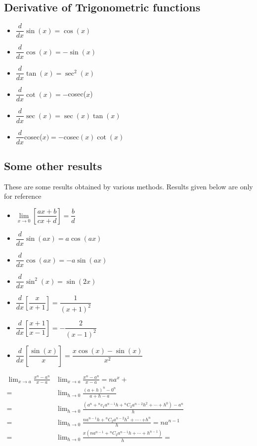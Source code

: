 \documentclass{article}
\begin{document}
\subsection{Derivative of Trigonometric functions}
\begin{itemize}
  \item $\dfrac{d}{dx}\sin(x) = \cos(x)$
  \item $\dfrac{d}{dx}\cos(x) = -\sin(x)$
  \item $\dfrac{d}{dx}\tan(x) = \sec^2(x)$
  \item $\dfrac{d}{dx}\cot(x) = -$cosec($x$)
  \item $\dfrac{d}{dx}\sec(x) = \sec(x)\tan(x)$
  \item $\dfrac{d}{dx}$cosec($x) = -$cosec$(x)\cot(x)$
\end{itemize}

\subsection{Some other results}
\par These are some results obtained by various methods. Results given below are only for reference
\begin{itemize}
  \item $\lim\limits_{x \to 0}\left[\dfrac{ax + b}{cx + d}\right] = \dfrac{b}{d}$
  \item $\dfrac{d}{dx}\sin(ax) = a\cos(ax)$
  \item $\dfrac{d}{dx}\cos(ax) = -a\sin(ax)$
  \item $\dfrac{d}{dx}\sin^2(x) = \sin(2x)$
  \item $\dfrac{d}{dx}\left[\dfrac{x}{x+1}\right] = \dfrac{1}{(x+1)^2}$
  \item $\dfrac{d}{dx}\left[\dfrac{x+1}{x-1}\right] = -\dfrac{2}{(x-1)^2}$
  \item $\dfrac{d}{dx}\left[\dfrac{\sin(x)}{x}\right] = \dfrac{x\cos(x) - \sin(x)}{x^2}$


\end{itemize}
$\begin{aligned} \lim _{x \rightarrow a} \frac{x^{n}-a^{n}}{x-a} & \lim _{x \rightarrow a} \frac{x^{n}-a^{n}}{x-a}=n a^{x}+\\=& \lim _{h \rightarrow 0} \frac{(a+h)^{n}-0^{n}}{a+h-a} \\=& \lim _{h \rightarrow 0} \frac{\left(a^{n}+{ }^{n} c_{1} a^{n-1} h+{ }^{n} C_{2} a^{n-2} h^{2}+\cdots+h^{0}\right)-a^{n}}{h} \\=& \lim _{h \rightarrow 0} \frac{n a^{n-1} h+{ }^{n} C_{2} a^{n-2} h^{2}+\cdots \cdot+h^{n}}{h}=n a^{n-1} \\=& \lim _{h \rightarrow 0} \frac{x\left(n a^{n-1}+{ }^{n} C_{2} a^{n-1} h+\cdots+h^{n-1}\right)}{h}=\end{aligned}$
\end{document}
